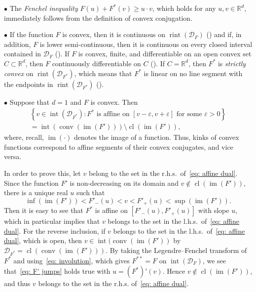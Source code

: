 \documentclass[AHL,Unicode,published]{cedram}
\DeclareMathOperator{\conv}{conv}
\DeclareMathOperator{\im}{im}
\DeclareMathOperator{\cl}{cl}
\DeclareMathOperator{\rint}{rint}
\DeclareMathOperator{\intr}{int}
\newcommand{\Rbb}{\mathbb{R}}
\newcommand{\Dcl}{\mathcal{D}}
\begin{document}
$\bullet$ The \emph{Fenchel inequality} $F(u) + F^*(v) \ge u \cdot v$, which holds for any $u, v \in \Rbb^d$, immediately follows from the definition of convex conjugation.


$\bullet$ If the function $F$ is convex, then it is continuous on $\rint (\Dcl_F)$ (\cite[Theorem~10.1]{Rockafellar}) and if, in addition, $F$ is lower semi-continuous, then it is continuous on every closed interval contained in $\Dcl_F$ (\cite[Corollary~7.5.1]{Rockafellar}). If $F$ is convex, finite, and differentiable on an open convex set $C \subset \Rbb^d$, then $F$ continuously differentiable on $C$ (\cite[Corollary~25.5.1]{Rockafellar}). If $C=\Rbb^d$, then $F^*$ is \emph{strictly convex} on $\rint (\Dcl_{F^*})$, which means that $F^*$ is linear on no line segment with the endpoints in $\rint (\Dcl_{F^*})$ (\cite[Theorem~26.3]{Rockafellar}).

$\bullet$ Suppose that $d=1$ and $F$ is convex. Then
\begin{multline}\label{eq: affine dual}
\left\{v \in \intr(\Dcl_{F^*}): F^* \text{ is affine on } [v-\varepsilon, v+\varepsilon] \text{ for some } \varepsilon >0\right\} \\ = \intr (\conv(\im (F'))) \setminus \cl(\im (F')),
\end{multline}
where, recall, $\im(\cdot)$ denotes the image of a function. Thus, kinks of convex functions correspond to affine segments of their convex conjugates, and vice versa.

In order to prove this, let $v$ belong to the set in the r.h.s.\ of~\eqref{eq: affine dual}. Since the function $F'$ is non-decreasing on its domain and $v \notin \cl(\im (F'))$, there is a unique real $u$ such that
\begin{equation}\label{eq: F' jumps}
\inf (\im (F')) < F'_-(u) < v < F'_+(u) < \sup (\im (F')).
\end{equation}
Then it is easy to see that $F^*$ is affine on $[F'_-(u), F'_+(u)]$ with slope $u$, which in particular implies that $v$ belongs to the set in the l.h.s.\ of~\eqref{eq: affine dual}. For the reverse inclusion, if $v$ belongs to the set in the l.h.s.\ of~\eqref{eq: affine dual}, which is open, then $v \in \intr \bigl(\conv(\im (F'))$ by $\Dcl_{F^*} = \cl (\conv(\im (F')))$. By taking the Legendre--Fenchel transform of $F^*$ and using~\eqref{eq: involution}, which gives $F^{**}=F$ on $\intr(\Dcl_F)$, we see that~\eqref{eq: F' jumps} holds true with $u=(F^*)'(v)$. Hence $v \not \in \cl(\im (F'))$, and thus $v$ belongs to the set in the r.h.s. of~\eqref{eq: affine dual}.
\end{document}
